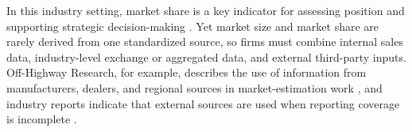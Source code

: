 






In this industry setting, market share is a key indicator for assessing position and supporting strategic decision-making \cite{kotler2016marketing}. Yet market size and market share are rarely derived from one standardized source, so firms must combine internal sales data, industry-level exchange or aggregated data, and external third-party inputs. Off-Highway Research, for example, describes the use of information from manufacturers, dealers, and regional sources in market-estimation work \cite{offhighway2018method}, and industry reports indicate that external sources are used when reporting coverage is incomplete \cite{mordor2024construction}.

